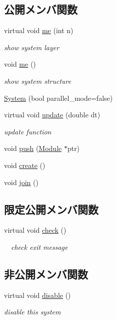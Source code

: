 \subsection*{公開メンバ関数}
\begin{DoxyCompactItemize}
\item 
virtual void \hyperlink{classfractal_1_1System_aa8e8768417ccfe745def786d63eee80d}{me} (int n)
\begin{DoxyCompactList}\small\item\em show system layer \end{DoxyCompactList}\item 
void \hyperlink{classfractal_1_1System_ae1da12b267d3fe5b811e4130ae888b50}{me} ()
\begin{DoxyCompactList}\small\item\em show system structure \end{DoxyCompactList}\item 
\hyperlink{classfractal_1_1System_a2d135113ff09a5cce9871ab696b40087}{System} (bool parallel\+\_\+mode=false)
\item 
virtual void \hyperlink{classfractal_1_1System_a86fe5dae233bd52be06fe950087787d9}{update} (double dt)
\begin{DoxyCompactList}\small\item\em update function \end{DoxyCompactList}\item 
void \hyperlink{classfractal_1_1System_a69dd1513fed01dd3cf455763bd243f5e}{push} (\hyperlink{classfractal_1_1Module}{Module} $\ast$ptr)
\item 
void \hyperlink{classfractal_1_1System_a00d5baae4bcc777c43da65299b464a43}{create} ()
\item 
void \hyperlink{classfractal_1_1System_afcd530ae6b4fd18a74fb807e56bd5fff}{join} ()
\end{DoxyCompactItemize}
\subsection*{限定公開メンバ関数}
\begin{DoxyCompactItemize}
\item 
virtual void \hyperlink{classfractal_1_1System_a95f99e9132a10f87f9179a27c840fa50}{check} ()
\begin{DoxyCompactList}\small\item\em 　check exit message \end{DoxyCompactList}\end{DoxyCompactItemize}
\subsection*{非公開メンバ関数}
\begin{DoxyCompactItemize}
\item 
virtual void \hyperlink{classfractal_1_1System_a446532d4c3811f6005e0c52ad653a997}{disable} ()
\begin{DoxyCompactList}\small\item\em disable this system \end{DoxyCompactList}\end{DoxyCompactItemize}
